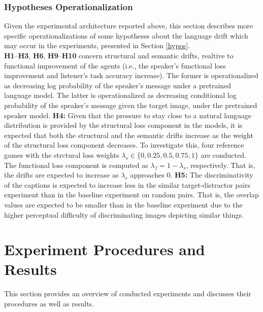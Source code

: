 \subsubsection{Hypotheses Operationalization}
Given the experimental architecture reported above, this section describes more specific operationalizations of some hypotheses about the language drift which may occur in the experiments, presented in Section \ref{hypos}.\\
\newline
\textbf{H1}--\textbf{H3}, \textbf{H6}, \textbf{H9}--\textbf{H10} concern structural and semantic drifts, realtive to functional improvement of the agents (i.e., the speaker's functional loss improvement and listener's task accuracy increase). The former is operationalized as decreasing log probability of the speaker's message under a pretrained language model. The latter is operationalized as decreasing conditional log probability of the speaker's message given the target image, under the pretrained speaker model. \newline
\textbf{H4:} Given that the pressure to stay close to a natural language distribution is provided by the structural loss component in the models, it is expected that both the structural and the semantic drifts increase as the weight of the structural loss component decreases. To investigate this, four reference games with the strctural loss weights $\lambda_s \in \{0, 0.25, 0.5, 0.75, 1\}$ are conducted. The functional loss component is computed as $\lambda_f = 1 - \lambda_s$, respectively. That is, the drifts are expected to increase as $\lambda_s$ approaches 0.\newline
\textbf{H5:} The discriminativity of the captions is expected to increase less in the similar target-distractor pairs experiment than in the baseline experiment on random pairs. That is, the overlap values are expected to be smaller than in the baseline experiment due to the higher perceptual difficulty of discriminating images depicting similar things. 

\section{Experiment Procedures and Results}

This section provides an overview of conducted experiments and discusses their procedures as well as results.

